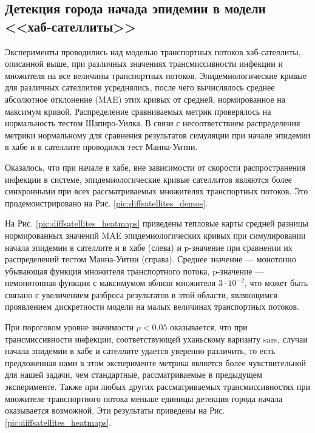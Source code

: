 \documentclass[a4paper,12pt]{article} %
\begin{document}
\subsection{Детекция города начада эпидемии в модели <<хаб-сателлиты>>}

Эксперименты проводились над моделью транспортных потоков хаб-сателлиты, описанной выше, при различных значениях трансмиссивности инфекции и множителя на все величины транспортных потоков. Эпидемиологические кривые для различных сателлитов усреднялись, после чего вычислялось среднее абсолютное отклонение (MAE) этих кривых от средней, нормированное на максимум кривой. Распределение сравниваемых метрик проверялось на нормальность тестом Шапиро-Уилка. В связи с несоответствием распределения метрики нормальному для сравнения результатов симуляции при начале эпидемии в хабе и в сателлите проводился тест Манна-Уитни.

Оказалось, что при начале в хабе, вне зависимости от скорости распространения инфекции в системе, эпидемиологические кривые сателлитов являются более синхронными при всех рассматриваемых множителях транспортных потоков. Это продемонстрировано на Рис. \ref{pic:diffsatellites_demos}.

На Рис. \ref{pic:diffsatellites_heatmaps} приведены тепловые карты средней разницы нормированных значений MAE эпидемиологических кривых при симулировании начала эпидемии в сателлите и в хабе (слева) и p-значение при сравнении их распределений тестом Манна-Уитни (справа). Среднее значение --- монотонно убывающая функция множителя транспортного потока, p-значение --- немонотонная функция с максимумом вблизи множителя $3\cdot 10^{-2}$, что может быть связано с увеличением разброса результатов в этой области, являющимся проявлением дискретности модели на малых величинах транспортных потоков. 

При пороговом уровне значимости $p<0.05$ оказывается, что при трансмиссивности инфекции, соответствующей уханьскому варианту \gls{sars}, случаи начала эпидемии в хабе и сателлите удается уверенно различить, то есть предложенная нами в этом эксперименте метрика является более чувствительной для нашей задачи, чем стандартные, рассматриваемые в предыдущем эксперименте. Также при любых других рассматриваемых трансмиссивностях при множителе транспортного потока меньше единицы детекция города начала оказывается возможной. Эти результаты приведены на Рис. \ref{pic:diffsatellites_heatmaps}.
 
\end{document}
